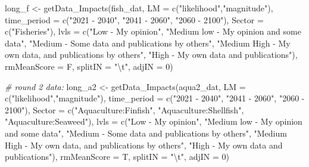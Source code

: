 \documentclass[
]{article}
\newenvironment{Shaded}{\begin{snugshade}}{\end{snugshade}}
\newcommand{\AttributeTok}[1]{\textcolor[rgb]{0.77,0.63,0.00}{#1}}
\newcommand{\CommentTok}[1]{\textcolor[rgb]{0.56,0.35,0.01}{\textit{#1}}}
\newcommand{\DecValTok}[1]{\textcolor[rgb]{0.00,0.00,0.81}{#1}}
\newcommand{\FunctionTok}[1]{\textcolor[rgb]{0.00,0.00,0.00}{#1}}
\newcommand{\NormalTok}[1]{#1}
\newcommand{\OtherTok}[1]{\textcolor[rgb]{0.56,0.35,0.01}{#1}}
\newcommand{\SpecialCharTok}[1]{\textcolor[rgb]{0.00,0.00,0.00}{#1}}
\newcommand{\StringTok}[1]{\textcolor[rgb]{0.31,0.60,0.02}{#1}}
\begin{document}
\begin{Shaded}
\begin{Highlighting}[]
\NormalTok{    long\_f }\OtherTok{\textless{}{-}} \FunctionTok{getData\_Impacts}\NormalTok{(fish\_dat,}
                    \AttributeTok{LM  =} \FunctionTok{c}\NormalTok{(}\StringTok{"likelihood"}\NormalTok{,}\StringTok{"magnitude"}\NormalTok{),}
                    \AttributeTok{time\_period  =} \FunctionTok{c}\NormalTok{(}\StringTok{"2021 {-} 2040"}\NormalTok{, }\StringTok{"2041 {-} 2060"}\NormalTok{, }\StringTok{"2060 {-} 2100"}\NormalTok{),}
                    \AttributeTok{Sector  =} \FunctionTok{c}\NormalTok{(}\StringTok{"Fisheries"}\NormalTok{),}
                    \AttributeTok{lvls  =} \FunctionTok{c}\NormalTok{(}\StringTok{"Low  {-} My opinion"}\NormalTok{,}
                              \StringTok{"Medium low {-} My opinion and some data"}\NormalTok{,}
                              \StringTok{"Medium {-} Some data and publications by others"}\NormalTok{,}
                              \StringTok{"Medium High {-} My own data, and publications by others"}\NormalTok{,}
                              \StringTok{"High {-} My own data and publications"}\NormalTok{),}
                    \AttributeTok{rmMeanScore =}\NormalTok{ F, }
                    \AttributeTok{splitIN =} \StringTok{"}\SpecialCharTok{\textbackslash{}t}\StringTok{"}\NormalTok{,}
                    \AttributeTok{adjIN =} \DecValTok{0}\NormalTok{)}
    
    \CommentTok{\# round 2 data:}
\NormalTok{    long\_a2 }\OtherTok{\textless{}{-}} \FunctionTok{getData\_Impacts}\NormalTok{(aqua2\_dat,}
                    \AttributeTok{LM  =} \FunctionTok{c}\NormalTok{(}\StringTok{"likelihood"}\NormalTok{,}\StringTok{"magnitude"}\NormalTok{),}
                    \AttributeTok{time\_period  =} \FunctionTok{c}\NormalTok{(}\StringTok{"2021 {-} 2040"}\NormalTok{, }\StringTok{"2041 {-} 2060"}\NormalTok{, }\StringTok{"2060 {-} 2100"}\NormalTok{),}
                    \AttributeTok{Sector  =} \FunctionTok{c}\NormalTok{(}\StringTok{"Aquaculture:Finfish"}\NormalTok{,}
                              \StringTok{"Aquaculture:Shellfish"}\NormalTok{,}
                              \StringTok{"Aquaculture:Seaweed"}\NormalTok{),}
                    \AttributeTok{lvls  =} \FunctionTok{c}\NormalTok{(}\StringTok{"Low  {-} My opinion"}\NormalTok{,}
                              \StringTok{"Medium low {-} My opinion and some data"}\NormalTok{,}
                              \StringTok{"Medium {-} Some data and publications by others"}\NormalTok{,}
                              \StringTok{"Medium High {-} My own data, and publications by others"}\NormalTok{,}
                              \StringTok{"High {-} My own data and publications"}\NormalTok{),}
                    \AttributeTok{rmMeanScore =}\NormalTok{ T, }
                    \AttributeTok{splitIN =} \StringTok{"}\SpecialCharTok{\textbackslash{}t}\StringTok{"}\NormalTok{,}
                    \AttributeTok{adjIN =} \DecValTok{0}\NormalTok{)}
    

\end{Highlighting}
\end{Shaded}
\end{document}
